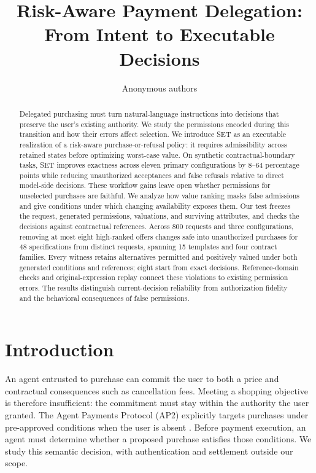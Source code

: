 \documentclass[11pt]{article}
\title{Risk-Aware Payment Delegation:\\From Intent to Executable Decisions}
\author{Anonymous authors}
\date{}
\begin{document}
\maketitle
\begin{abstract}
Delegated purchasing must turn natural-language instructions into decisions that preserve the user's existing authority. We study the permissions encoded during this transition and how their errors affect selection. We introduce SET as an executable realization of a risk-aware purchase-or-refusal policy: it requires admissibility across retained states before optimizing worst-case value. On synthetic contractual-boundary tasks, SET improves exactness across eleven primary configurations by 8--64 percentage points while reducing unauthorized acceptances and false refusals relative to direct model-side decisions. These workflow gains leave open whether permissions for unselected purchases are faithful. We analyze how value ranking masks false admissions and give conditions under which changing availability exposes them. Our test freezes the request, generated permissions, valuations, and surviving attributes, and checks the decisions against contractual references. Across 800 requests and three configurations, removing at most eight high-ranked offers changes safe into unauthorized purchases for 48 specifications from distinct requests, spanning 15 templates and four contract families. Every witness retains alternatives permitted and positively valued under both generated conditions and references; eight start from exact decisions. Reference-domain checks and original-expression replay connect these violations to existing permission errors. The results distinguish current-decision reliability from authorization fidelity and the behavioral consequences of false permissions.
\end{abstract}

\section{Introduction}
\label{sec:introduction}
An agent entrusted to purchase can commit the user to both a price and contractual consequences such as cancellation fees. Meeting a shopping objective is therefore insufficient: the commitment must stay within the authority the user granted. The Agent Payments Protocol (AP2) explicitly targets purchases under pre-approved conditions when the user is absent \citep{ap2}. Before payment execution, an agent must determine whether a proposed purchase satisfies those conditions. We study this semantic decision, with authentication and settlement outside our scope.
\end{document}
